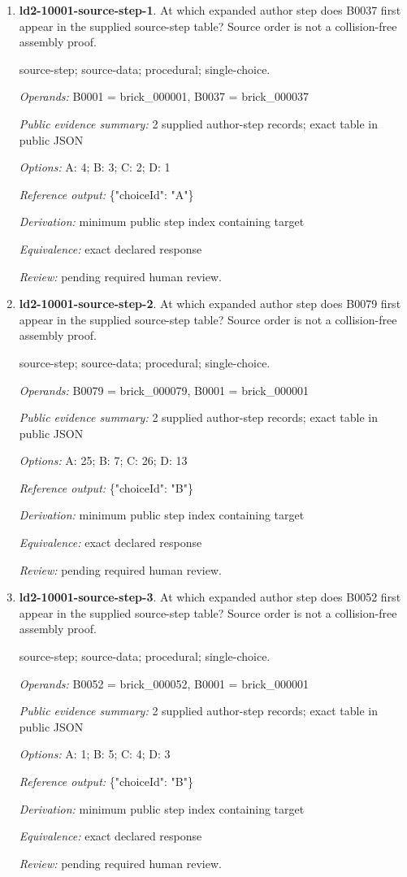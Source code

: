\begin{enumerate}
\item \textbf{ld2-10001-source-step-1}. At which expanded author step does B0037 first appear in the supplied source-step table? Source order is not a collision-free assembly proof.
\par{\small source-step; source-data; procedural; single-choice.\par\textit{Operands:} B0001 = brick\_000001, B0037 = brick\_000037\par\textit{Public evidence summary:} 2 supplied author-step records; exact table in public JSON\par\textit{Options:} A: 4; B: 3; C: 2; D: 1\par\textit{Reference output:} \{"choiceId": "A"\}\par\textit{Derivation:} minimum public step index containing target\par\textit{Equivalence:} exact declared response\par\textit{Review:} pending required human review.}
\item \textbf{ld2-10001-source-step-2}. At which expanded author step does B0079 first appear in the supplied source-step table? Source order is not a collision-free assembly proof.
\par{\small source-step; source-data; procedural; single-choice.\par\textit{Operands:} B0079 = brick\_000079, B0001 = brick\_000001\par\textit{Public evidence summary:} 2 supplied author-step records; exact table in public JSON\par\textit{Options:} A: 25; B: 7; C: 26; D: 13\par\textit{Reference output:} \{"choiceId": "B"\}\par\textit{Derivation:} minimum public step index containing target\par\textit{Equivalence:} exact declared response\par\textit{Review:} pending required human review.}
\item \textbf{ld2-10001-source-step-3}. At which expanded author step does B0052 first appear in the supplied source-step table? Source order is not a collision-free assembly proof.
\par{\small source-step; source-data; procedural; single-choice.\par\textit{Operands:} B0052 = brick\_000052, B0001 = brick\_000001\par\textit{Public evidence summary:} 2 supplied author-step records; exact table in public JSON\par\textit{Options:} A: 1; B: 5; C: 4; D: 3\par\textit{Reference output:} \{"choiceId": "B"\}\par\textit{Derivation:} minimum public step index containing target\par\textit{Equivalence:} exact declared response\par\textit{Review:} pending required human review.}

\end{enumerate}
